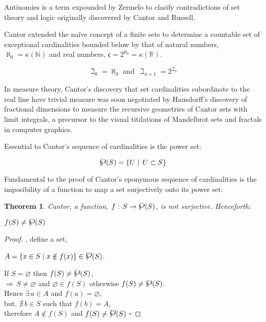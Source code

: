 \documentclass[aps,twocolumn,secnumarabic,nobalancelastpage,amsmath,amssymb,
amsthm,nofootinbib,parskip=full]{revtex4}
\newtheorem{theorem}{Theorem}[section]
\newtheorem{proof}{Proof}[theorem]
\numberwithin{equation}{section}
\newcommand{\pset}[1]{{\raisebox{.15\baselineskip}{\Large\ensuremath{\wp}}}(#1)}
\newcommand{\scard}[1]{\kappa(#1)}
\begin{document}
Antinomies is a term expounded by Zermelo to clasify
contradictions of set theory and logic originally discovered
by Cantor and Russell.

Cantor extended the na\"{i}ve concept of a finite sets to
determine a countable set of exceptional cardinalities
bounded below by that of natural numbers, $\aleph_0=\scard{\mathbb{N}}$
and real numbers, $\mathfrak{c}=2^{\aleph_0}=\scard{\mathbb{R}}$.

\begin{equation}
  \beth_0=\aleph_0\,\,\text{and}\,\,\,\beth_{n+1}=2^{\beth_n}
\end{equation}

In measure theory, Cantor's discovery that set
cardinalities subordinate to the real line have trivial measure
was soon negotiated by Hausdorff's discovery of fractional dimensions
to measure the recursive geometries of Cantor sets with limit integrals,
a precursor to the visual titilations of
Mandelbrot sets and fractals in computer graphics.

Essential to Cantor's sequence of cardinalities is the power set:

\begin{equation}\label{eq:pset}
  \pset{S}=\{U\mid\,U\subset S\}
\end{equation}

Fundamental to the proof of Cantor's eponymous sequence of cardinalities
is the imposibility of a function to map a set surjectively onto its power set:

\begin{theorem}{Cantor}\label{th:cantor}, a function,
  $f:\,S\rightarrow\pset{S}$,
  is not surjective. Henceforth:
  \begin{center}
    $f(S)\neq\pset{S}$
  \end{center}
\end{theorem}

\begin{proof},
  define a set, \\
  \begin{center}
  $A=\{x\in S\mid x\notin f(x)\}\in\pset{S}$.
  \end{center}
  If $S=\varnothing$ then $f(S)\neq\pset{S}$, \\
  $\Rightarrow\,S\neq\varnothing$ and
  $\varnothing\in f(S)$ otherwise $f(S)\neq\pset{S}$. \\
  Hence $\exists\,a\in A$ and $f(a)=\varnothing$, \\
  but, $\nexists\,b\in S$ such that $f(b)=A$, \\
  therefore $A\notin f(S)$ and $f(S)\neq\pset{S}$ $\square$
\end{proof}
\end{document}

